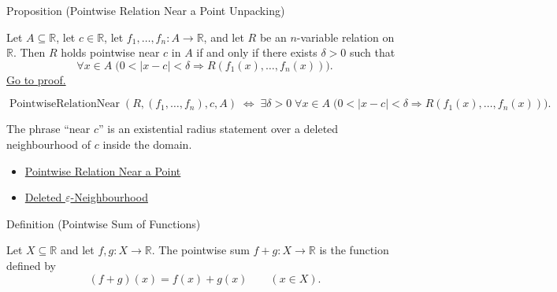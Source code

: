 \begin{propositionbox}{Proposition (Pointwise Relation Near a Point Unpacking)}
\begin{proposition}
\label{prop:pointwise-relation-near-unpacking}
Let \(A\subseteq\mathbb{R}\), let \(c\in\mathbb{R}\), let
\(f_1,\ldots,f_n:A\to\mathbb{R}\), and let \(R\) be an \(n\)-variable
relation on \(\mathbb{R}\).  Then \(R\) holds pointwise near \(c\) in
\(A\) if and only if there exists \(\delta>0\) such that
\[
  \forall x\in A\;
  \bigl(0<|x-c|<\delta
  \Rightarrow R(f_1(x),\ldots,f_n(x))\bigr).
\]
\hyperref[prf:pointwise-relation-near-unpacking]{Go to proof.}
\end{proposition}
\end{propositionbox}

\begin{remark*}
\[
  \operatorname{PointwiseRelationNear}(R,(f_1,\ldots,f_n),c,A)
  \;\Longleftrightarrow\;
  \exists\delta>0\;\forall x\in A\;
  \bigl(0<|x-c|<\delta
  \Rightarrow R(f_1(x),\ldots,f_n(x))\bigr).
\]
\end{remark*}

\begin{remark*}[Interpretation]
The phrase ``near \(c\)'' is an existential radius statement over a deleted
neighbourhood of \(c\) inside the domain.
\end{remark*}

\begin{dependencies}
\begin{itemize}
  \item \hyperref[def:pointwise-relation-near-point]{Pointwise Relation Near a Point}
  \item \hyperref[def:deleted-epsilon-neighbourhood]{Deleted \(\varepsilon\)-Neighbourhood}
\end{itemize}
\end{dependencies}


\begin{definitionbox}{Definition (Pointwise Sum of Functions)}
\begin{definition}
\label{def:pointwise-sum-of-functions}
Let $X\subseteq\mathbb{R}$ and let $f,g:X\to\mathbb{R}$.  The
pointwise sum $f+g:X\to\mathbb{R}$ is the function defined by
\[
  (f+g)(x)=f(x)+g(x)
  \qquad (x\in X).
\]
\end{definition}
\end{definitionbox}

